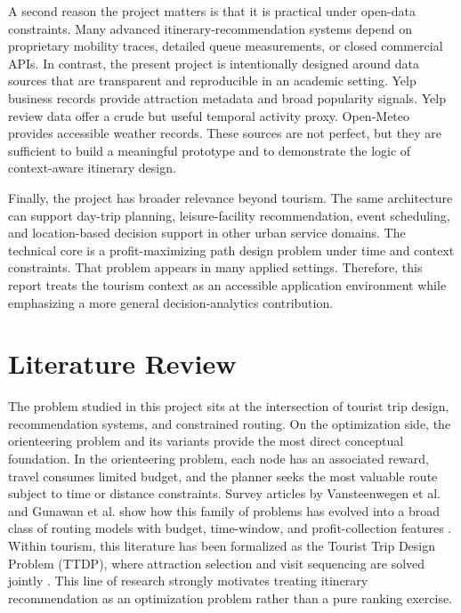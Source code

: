 \documentclass[12pt,a4paper]{article}
\begin{document}
A second reason the project matters is that it is practical under open-data constraints. Many advanced itinerary-recommendation systems depend on proprietary mobility traces, detailed queue measurements, or closed commercial APIs. In contrast, the present project is intentionally designed around data sources that are transparent and reproducible in an academic setting. Yelp business records provide attraction metadata and broad popularity signals. Yelp review data offer a crude but useful temporal activity proxy. Open-Meteo provides accessible weather records. These sources are not perfect, but they are sufficient to build a meaningful prototype and to demonstrate the logic of context-aware itinerary design.

Finally, the project has broader relevance beyond tourism. The same architecture can support day-trip planning, leisure-facility recommendation, event scheduling, and location-based decision support in other urban service domains. The technical core is a profit-maximizing path design problem under time and context constraints. That problem appears in many applied settings. Therefore, this report treats the tourism context as an accessible application environment while emphasizing a more general decision-analytics contribution.

\section{Literature Review}

The problem studied in this project sits at the intersection of tourist trip design, recommendation systems, and constrained routing. On the optimization side, the orienteering problem and its variants provide the most direct conceptual foundation. In the orienteering problem, each node has an associated reward, travel consumes limited budget, and the planner seeks the most valuable route subject to time or distance constraints. Survey articles by Vansteenwegen et al. and Gunawan et al. show how this family of problems has evolved into a broad class of routing models with budget, time-window, and profit-collection features \citep{vansteenwegen2011orienteering, gunawan2016orienteering}. Within tourism, this literature has been formalized as the Tourist Trip Design Problem (TTDP), where attraction selection and visit sequencing are solved jointly \citep{ruizmeza2022ttdp}. This line of research strongly motivates treating itinerary recommendation as an optimization problem rather than a pure ranking exercise.
\end{document}
